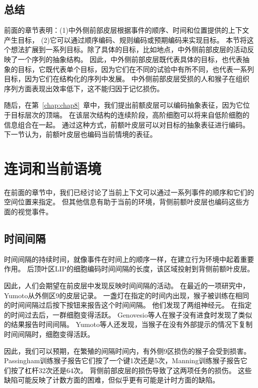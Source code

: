 \subsection{总结}

前面的章节表明：(1)中外侧前部皮层根据事件的顺序、时间和位置提供的上下文产生目标，
(2)它可以通过顺序编码、规则编码或预期编码来实现目标。
本节将这个想法扩展到一系列目标。除了具体的目标，比如地点，中外侧前部皮层的活动反映了一个序列的抽象结构。
因此，中外侧前部皮层既代表具体的目标，也代表抽象的目标，它既代表单个目标，因为它们在不同的试验中有所不同，也代表一系列目标，因为它们在结构化的序列中发展。
中外侧前部皮层受损的人和猴子在组织序列方面表现出效率低下，这不能归因于记忆损伤。


随后，在第~\ref{chap:chap8}~章中，我们提出前额皮层可以编码抽象表征，因为它位于目标层次的顶端。
在该层次结构的连续阶段，高阶细胞可以将来自低阶细胞的信息组合在一起。
通过这种方式，前额叶皮层可以对目标的抽象表征进行编码。
下一节认为，前额叶皮层也编码当前情境的表征。



\section{连词和当前语境}

在前面的章节中，我们已经讨论了当前上下文可以通过一系列事件的顺序和它们的空间位置来指定。
但其他信息有助于当前的环境，背侧前额叶皮层也编码这些方面的视觉事件。


\subsection{时间间隔}

时间间隔的持续时间，就像事件在时间上的顺序一样，在建立行为环境中起着重要作用。
后顶叶区LIP的细胞编码时间间隔的长度\cite{leon2003representation}，该区域投射到背侧前额叶皮层。


因此，人们会期望在前皮层中发现反映时间间隔的活动。
在最近的一项研究中，Yumoto\cite{yumoto2011neural}从外侧区9的皮层记录。
一盏灯在指定的时间内出现，猴子被训练在相同的时间间隔过后按下按钮来报告这个时间间隔。
他们发现了两组神经元。
在指定的时间过去后，一群细胞变得活跃。
Genovesio等人\cite{genovesio2006neuronal}在猴子没有进食时发现了类似的结果报告时间间隔。
Yumoto等人还发现，当猴子在没有外部提示的情况下复制时间间隔时，细胞变得活跃。


因此，我们可以预期，在繁殖的间隔时间内，有外侧9区损伤的猴子会受到损害。
Passingham\cite{passingham1978information}训练猴子报告它们按了一个键1次还是5次，Manning\cite{manning1978dorsolateral}训练猴子报告它们按了杠杆32次还是64次。
背侧前部皮层的损伤导致了这两项任务的损伤。
这些缺陷可能反映了计数方面的困难，但似乎更有可能是计时方面的缺陷。


